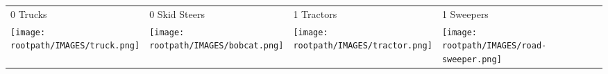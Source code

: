 \begin{tabular}{m{}m{}m{}m{}}
    {\color{ccorange} 0 Trucks} & {\color{ccorange} 0 Skid Steers} & {\color{ccorange} 1 Tractors} & {\color{ccorange} 1 Sweepers} \\
    \texttt{[image: \\rootpath/IMAGES/truck.png]}  & \texttt{[image: \\rootpath/IMAGES/bobcat.png]} & \texttt{[image: \\rootpath/IMAGES/tractor.png]} & \texttt{[image: \\rootpath/IMAGES/road-sweeper.png]}                         
    \end{tabular}